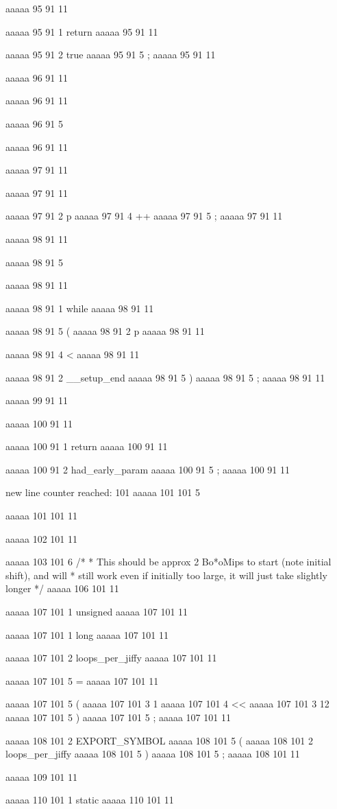 {{{aaaaa 95 91
11
	
aaaaa 95 91
1
return
aaaaa 95 91
11
 
aaaaa 95 91
2
true
aaaaa 95 91
5
;
aaaaa 95 91
11


aaaaa 96 91
11
	
aaaaa 96 91
11
	
aaaaa 96 91
5
}
aaaaa 96 91
11


aaaaa 97 91
11
	
aaaaa 97 91
11
	
aaaaa 97 91
2
p
aaaaa 97 91
4
++
aaaaa 97 91
5
;
aaaaa 97 91
11


aaaaa 98 91
11
	
aaaaa 98 91
5
}
aaaaa 98 91
11
 
aaaaa 98 91
1
while
aaaaa 98 91
11
 
aaaaa 98 91
5
(
aaaaa 98 91
2
p
aaaaa 98 91
11
 
aaaaa 98 91
4
<
aaaaa 98 91
11
 
aaaaa 98 91
2
__setup_end
aaaaa 98 91
5
)
aaaaa 98 91
5
;
aaaaa 98 91
11


aaaaa 99 91
11


aaaaa 100 91
11
	
aaaaa 100 91
1
return
aaaaa 100 91
11
 
aaaaa 100 91
2
had_early_param
aaaaa 100 91
5
;
aaaaa 100 91
11


new line counter reached: 101
aaaaa 101 101
5
}
aaaaa 101 101
11


aaaaa 102 101
11


aaaaa 103 101
6
/*
 * This should be approx 2 Bo*oMips to start (note initial shift), and will
 * still work even if initially too large, it will just take slightly longer
 */
aaaaa 106 101
11


aaaaa 107 101
1
unsigned
aaaaa 107 101
11
 
aaaaa 107 101
1
long
aaaaa 107 101
11
 
aaaaa 107 101
2
loops_per_jiffy
aaaaa 107 101
11
 
aaaaa 107 101
5
=
aaaaa 107 101
11
 
aaaaa 107 101
5
(
aaaaa 107 101
3
1
aaaaa 107 101
4
<<
aaaaa 107 101
3
12
aaaaa 107 101
5
)
aaaaa 107 101
5
;
aaaaa 107 101
11


aaaaa 108 101
2
EXPORT_SYMBOL
aaaaa 108 101
5
(
aaaaa 108 101
2
loops_per_jiffy
aaaaa 108 101
5
)
aaaaa 108 101
5
;
aaaaa 108 101
11


aaaaa 109 101
11


aaaaa 110 101
1
static
aaaaa 110 101
11
 
